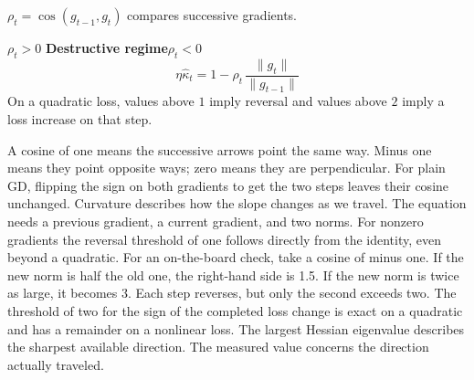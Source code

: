 {\(\rho_t=\cos(g_{t-1},g_t)\) compares successive gradients.
\par{}\enspace \(\rho_t>0\) \hfill
{\color{Rust}\bfseries Destructive regime}\enspace \(\rho_t<0\)
\vspace{3mm}
\[
   \eta\widehat\kappa_t
      =1-\rho_t\,\frac{\|g_t\|}{\|g_{t-1}\|}
\]
\small On a quadratic loss, values above \(1\) imply reversal and values above \(2\) imply a loss increase on that step.}
{A cosine of one means the successive arrows point the same way. Minus one means they point opposite ways; zero means they are perpendicular. For plain GD, flipping the sign on both gradients to get the two steps leaves their cosine unchanged. Curvature describes how the slope changes as we travel. The equation needs a previous gradient, a current gradient, and two norms. For nonzero gradients the reversal threshold of one follows directly from the identity, even beyond a quadratic. For an on-the-board check, take a cosine of minus one. If the new norm is half the old one, the right-hand side is 1.5. If the new norm is twice as large, it becomes 3. Each step reverses, but only the second exceeds two. The threshold of two for the sign of the completed loss change is exact on a quadratic and has a remainder on a nonlinear loss. The largest Hessian eigenvalue describes the sharpest available direction. The measured value concerns the direction actually traveled.}

